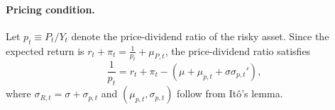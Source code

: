 

\paragraph{Pricing condition.} 

Let $p_t \equiv P_t/Y_t$ denote the price-dividend ratio of the risky asset. Since the expected return is $r_t + \pi_t = \frac{1}{p_t} + \mu_{P,t}$, the price-dividend ratio satisfies
\begin{equation}\label{eq:pricing_cond}
    \frac{1}{p_t} = r_t + \pi_t - (\mu + \mu_{p,t} + \sigma \sigma_{p,t}'),
\end{equation}
where $\sigma_{R,t} = \sigma + \sigma_{p,t}$ and $(\mu_{p,t},\sigma_{p,t})$ follow from Itô’s lemma.

